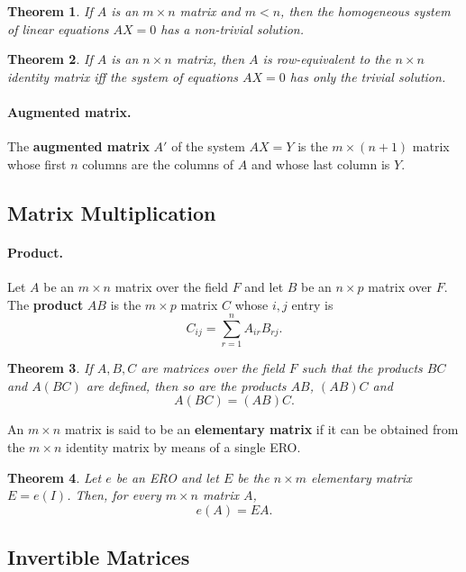 \documentclass{article}
\newtheorem{theorem}{Theorem}[section]
\begin{document}
\begin{theorem}
  If $A$ is an $m \times n$ matrix and $m < n$, then the homogeneous system of
  linear equations $AX = 0$ has a non-trivial solution.
\end{theorem}

\begin{theorem}
  If $A$ is an $n \times n$ matrix, then $A$ is row-equivalent to the $n \times
  n$ identity matrix iff the system of equations $AX = 0$ has only
  the trivial solution.
\end{theorem}

\paragraph{Augmented matrix.} The \textbf{augmented matrix} $A'$ of the system
$AX = Y$ is the $m \times (n + 1)$ matrix whose first $n$ columns are the
columns of $A$ and whose last column is $Y$.

\subsection{Matrix Multiplication}

\paragraph{Product.} Let $A$ be an $m \times n$ matrix over the field $F$ and
let $B$ be an $n \times p$ matrix over $F$. The \textbf{product} $AB$ is the $m
\times p$ matrix $C$ whose $i, j$ entry is \[
  C_{ij} = \sum_{r=1}^n A_{ir}B_{rj}.
\]

\begin{theorem}
  If $A, B, C$ are matrices over the field $F$ such that the products $BC$ and
  $A(BC)$ are defined, then so are the products $AB$, $(AB)C$ and \[
    A(BC) = (AB)C.
  \]
\end{theorem}

An $m \times n$ matrix is said to be an \textbf{elementary matrix} if it can be
obtained from the $m \times n$ identity matrix by means of a single ERO.

\begin{theorem}
  Let $e$ be an ERO and let $E$ be the $n \times m$ elementary matrix $E =
  e(I)$. Then, for every $m \times n$ matrix $A$, \[
    e(A) = EA.
  \]
\end{theorem}

\subsection{Invertible Matrices}
\end{document}
